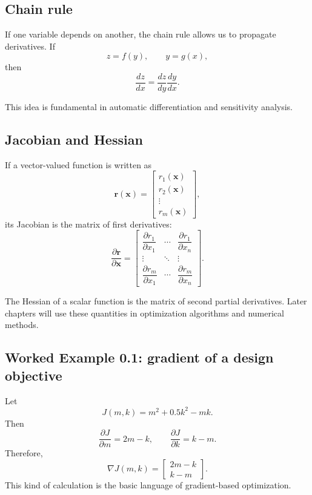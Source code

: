 \documentclass[11pt]{article}
\newcommand{\vect}[1]{\boldsymbol{#1}}
\begin{document}
\subsection{Chain rule}

If one variable depends on another, the chain rule allows us to propagate derivatives. If
\begin{equation}
z=f(y), \qquad y=g(x),
\end{equation}
then
\begin{equation}
\frac{dz}{dx}=\frac{dz}{dy}\frac{dy}{dx}.
\end{equation}

This idea is fundamental in automatic differentiation and sensitivity analysis.

\subsection{Jacobian and Hessian}

If a vector-valued function is written as
\begin{equation}
\vect{r}(\vect{x})=
\begin{bmatrix}
r_1(\vect{x})\\
r_2(\vect{x})\\
\vdots\\
r_m(\vect{x})
\end{bmatrix},
\end{equation}
its Jacobian is the matrix of first derivatives:
\begin{equation}
\frac{\partial \vect{r}}{\partial \vect{x}} =
\begin{bmatrix}
\dfrac{\partial r_1}{\partial x_1} & \cdots & \dfrac{\partial r_1}{\partial x_n} \\
\vdots & \ddots & \vdots \\
\dfrac{\partial r_m}{\partial x_1} & \cdots & \dfrac{\partial r_m}{\partial x_n}
\end{bmatrix}.
\end{equation}

The Hessian of a scalar function is the matrix of second partial derivatives. Later chapters will use these quantities in optimization algorithms and numerical methods.

\subsection{Worked Example 0.1: gradient of a design objective}

Let
\begin{equation}
J(m,k)=m^2+0.5k^2-mk.
\end{equation}
Then
\begin{equation}
\frac{\partial J}{\partial m}=2m-k,
\qquad
\frac{\partial J}{\partial k}=k-m.
\end{equation}
Therefore,
\begin{equation}
\nabla J(m,k)=
\begin{bmatrix}
2m-k \\
k-m
\end{bmatrix}.
\end{equation}
This kind of calculation is the basic language of gradient-based optimization.
\end{document}
